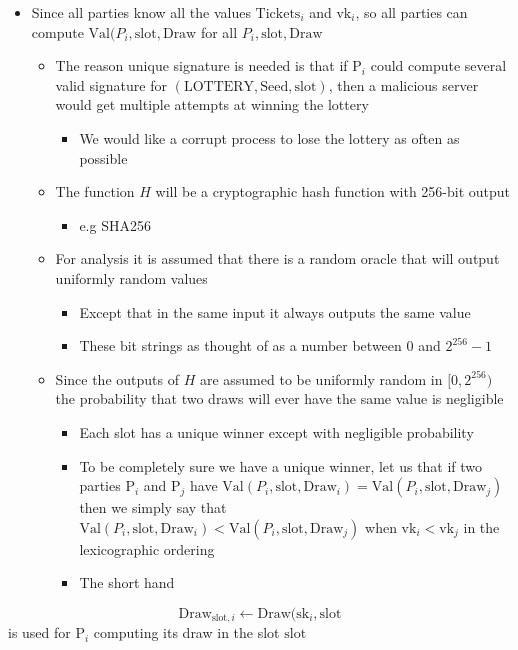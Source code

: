 \documentclass[11pt]{article}
\begin{document}
\begin{itemize}
\item Since all parties know all the values \(\text{Tickets}_i\) and \(\text{vk}_i\), so all parties can compute \(\text{Val}(P_i, \text{slot}, \text{Draw}\) for all \(P_i,\text{slot}, \text{Draw}\)
\begin{itemize}
\item The reason unique signature is needed is that if \(\text{P}_i\) could compute several valid signature for \((\text{LOTTERY}, \text{Seed}, \text{slot})\), then a malicious server would get multiple attempts at winning the lottery
\begin{itemize}
\item We would like a corrupt process to lose the lottery as often as possible
\end{itemize}
\item The function \(H\) will be a cryptographic hash function with 256-bit output
\begin{itemize}
\item e.g SHA256
\end{itemize}
\item For analysis it is assumed that there is a random oracle that will output uniformly random values
\begin{itemize}
\item Except that in the same input it always outputs the same value
\item These bit strings as thought of as a number between \(0\) and \(2^{256}-1\)
\end{itemize}
\item Since the outputs of \(H\) are assumed to be uniformly random in \([0,2^{256})\) the probability that two draws will ever have the same value is negligible
\begin{itemize}
\item Each slot has a unique winner except with negligible probability
\item To be completely sure we have a unique winner, let us that if two parties \(\text{P}_i\) and \(\text{P}_j\) have \(\text{Val}(P_i,\text{slot},\text{Draw}_i) = \text{Val}(P_i,\text{slot},\text{Draw}_j)\) then we simply say that \(\text{Val}(P_i,\text{slot},\text{Draw}_i) < \text{Val}(P_i,\text{slot},\text{Draw}_j)\) when \(\text{vk}_i<\text{vk}_j\) in the lexicographic ordering
\item The short hand
\end{itemize}
\end{itemize}
\end{itemize}
\begin{equation}
  \text{Draw}_{\text{slot},i} \leftarrow \text{Draw}(\text{sk}_i, \text{slot}
\end{equation}
is used for \(\text{P}_i\) computing its draw in the slot \(\text{slot}\)  
\end{document}
